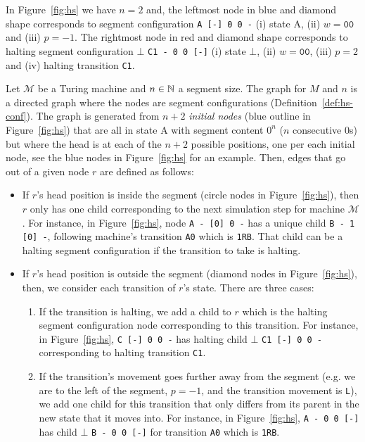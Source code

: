 \begin{example}\normalfont
  In Figure~\ref{fig:hs} we have $n=2$ and, the leftmost node in blue and diamond shape corresponds to segment configuration \texttt{A [-] 0 0 -} (i) state A, (ii) $w = \texttt{00}$ and (iii) $p = -1$. The rightmost node in red and diamond shape corresponds to halting segment configuration $\bot$ \texttt{C1 - 0 0 [-]} (i) state $\bot$, (ii) $w = \texttt{00}$, (iii) $p = 2$ and (iv) halting transition \texttt{C1}.
\end{example}

\begin{definition}[\HS graph]\label{def:hs-graph}\normalfont
  Let $\mathcal{M}$ be a Turing machine and $n \in \mathbb{N}$ a segment size. The \HS graph for $M$ and $n$ is a directed graph where the nodes are segment configurations (Definition~\ref{def:hs-conf}). The graph is generated from $n+2$ \textit{initial nodes} (blue outline in Figure~\ref{fig:hs}) that are all in state A with segment content $0^n$ ($n$ consecutive 0s) but where the head is at each of the $n+2$ possible positions, one per each initial node, see the blue nodes in Figure~\ref{fig:hs} for an example.
  Then, edges that go out of a given node $r$ are defined as follows:
  \begin{itemize}
    \item If $r$'s head position is inside the segment (circle nodes in Figure~\ref{fig:hs}), then $r$ only has one child corresponding to the next simulation step for machine $\mathcal{M}$. For instance, in Figure~\ref{fig:hs}, node \texttt{A - [0] 0 -} has a unique child \texttt{B - 1 [0] -}, following machine's transition \texttt{A0} which is \texttt{1RB}. That child can be a halting segment configuration if the transition to take is halting.
    \item If $r$'s head position is outside the segment (diamond nodes in Figure~\ref{fig:hs}), then, we consider each transition of $r$'s state. There are three cases:
          \begin{enumerate}
            \item If the transition is halting, we add a child to $r$ which is the halting segment configuration node corresponding to this transition. For instance, in Figure~\ref{fig:hs}, \texttt{C [-] 0 0 -} has halting child $\bot$ \texttt{C1 [-] 0 0 -} corresponding to halting transition \texttt{C1}.
            \item If the transition's movement goes further away from the segment (e.g. we are to the left of the segment, $p=-1$, and the transition movement is \texttt{L}), we add one child for this transition that only differs from its parent in the new state that it moves into. For instance, in Figure~\ref{fig:hs}, \texttt{A - 0 0 [-]} has child $\bot$ \texttt{B - 0 0 [-]} for transition \texttt{A0} which is \texttt{1RB}.

\end{enumerate}
\end{itemize}
\end{definition}
